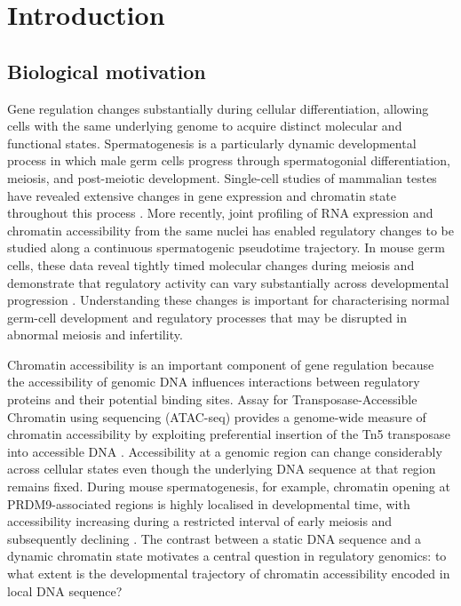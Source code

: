 \documentclass[a4paper,12pt]{article}
\begin{document}
\tableofcontents
\newpage
{}
{}
\listoffigures
\newpage
{}
{}
\listoftables
\clearpage


\section{Introduction}

\subsection{Biological motivation}

Gene regulation changes substantially during cellular differentiation, allowing cells with the same underlying genome to acquire distinct molecular and functional states. Spermatogenesis is a particularly dynamic developmental process in which male germ cells progress through spermatogonial differentiation, meiosis, and post-meiotic development. Single-cell studies of mammalian testes have revealed extensive changes in gene expression and chromatin state throughout this process \citep{jung2019,agarwal2026}. More recently, joint profiling of RNA expression and chromatin accessibility from the same nuclei has enabled regulatory changes to be studied along a continuous spermatogenic pseudotime trajectory. In mouse germ cells, these data reveal tightly timed molecular changes during meiosis and demonstrate that regulatory activity can vary substantially across developmental progression \citep{agarwal2026}. Understanding these changes is important for characterising normal germ-cell development and regulatory processes that may be disrupted in abnormal meiosis and infertility.

Chromatin accessibility is an important component of gene regulation because the accessibility of genomic DNA influences interactions between regulatory proteins and their potential binding sites. Assay for Transposase-Accessible Chromatin using sequencing (ATAC-seq) provides a genome-wide measure of chromatin accessibility by exploiting preferential insertion of the Tn5 transposase into accessible DNA \citep{buenrostro2013atac}. Accessibility at a genomic region can change considerably across cellular states even though the underlying DNA sequence at that region remains fixed. During mouse spermatogenesis, for example, chromatin opening at PRDM9-associated regions is highly localised in developmental time, with accessibility increasing during a restricted interval of early meiosis and subsequently declining \citep{agarwal2026}. The contrast between a static DNA sequence and a dynamic chromatin state motivates a central question in regulatory genomics: to what extent is the developmental trajectory of chromatin accessibility encoded in local DNA sequence?
\end{document}
